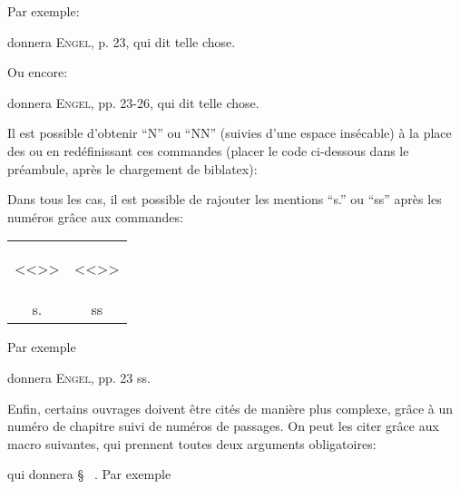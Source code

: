 \documentclass[a4paper]{ltxdockit}[2011/03/25]
\newcommand{\GM}{\enquote}
\newcommand{\Pex}{\textnormal{Par exemple}\xspace}
\begin{document}
\begin{enumerate}
\bigskip
\Pex:
donnera \textsc{Engel}, p. 23, qui dit telle chose.

\bigskip
Ou encore:
donnera \textsc{Engel}, pp. 23-26, qui dit telle chose.

\bigskip
Il est possible d'obtenir \GM{N} ou \GM{NN} (suivies d'une espace insécable) à la place des \parN ou \parNN en redéfinissant ces commandes (placer le code ci-dessous dans le préambule, après le chargement de biblatex):

\end{enumerate}


Dans tous les cas, il est possible de rajouter les mentions \GM{s.} ou \GM{ss} après les numéros grâce aux commandes:

\begin{tabular}{cc}

\begin{ltxcode}
<<\psq>>
\end{ltxcode} 

&

\begin{ltxcode}
<<\psqq>>
\end{ltxcode}

\\
s. & ss
\end{tabular}

\Pex
{}
donnera \textsc{Engel}, pp. 23 ss.

\nXIMark Enfin, certains ouvrages doivent être cités de manière plus complexe, grâce à un numéro de chapitre suivi de numéros de passages. On peut les citer grâce aux macro suivantes, qui prennent toutes deux arguments obligatoires:

\begin{ltxsyntax}
\end{ltxsyntax} 

qui donnera \S~ . \Pex
\end{document}
